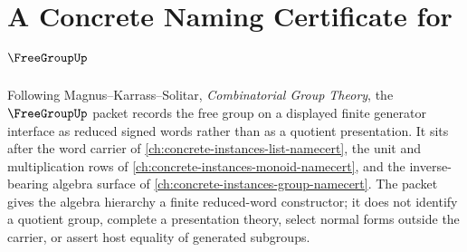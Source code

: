 \chapter{A Concrete Naming Certificate for $\FreeGroupUp$}
\label{ch:concrete-instances-free-group-namecert}

Following Magnus--Karrass--Solitar, \emph{Combinatorial Group Theory}, the $\FreeGroupUp$ packet records the free group on a displayed finite generator interface as reduced signed words rather than as a quotient presentation. It sits after the word carrier of \autoref{ch:concrete-instances-list-namecert}, the unit and multiplication rows of \autoref{ch:concrete-instances-monoid-namecert}, and the inverse-bearing algebra surface of \autoref{ch:concrete-instances-group-namecert}. The packet gives the algebra hierarchy a finite reduced-word constructor; it does not identify a quotient group, complete a presentation theory, select normal forms outside the carrier, or assert host equality of generated subgroups.

